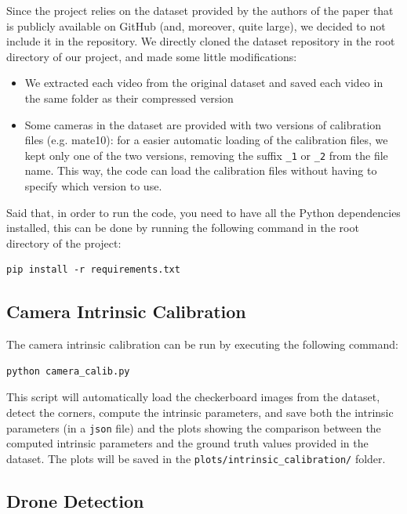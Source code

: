 \documentclass[11pt]{article}
\begin{document}
Since the project relies on the dataset provided by the authors of the paper that is publicly available on GitHub (and, moreover, quite large), we decided to not include it in the repository. We directly cloned the dataset repository in the root directory of our project, and made some little modifications:

\begin{itemize}
    \item We extracted each video from the original dataset and saved each video in the same folder as their compressed version
    \item Some cameras in the dataset are provided with two versions of calibration files (e.g. mate10): for a easier automatic loading of the calibration files, we kept only one of the two versions, removing the suffix \texttt{\_1} or \texttt{\_2} from the file name. This way, the code can load the calibration files without having to specify which version to use.
\end{itemize}

Said that, in order to run the code, you need to have all the Python dependencies installed, this can be done by running the following command in the root directory of the project:

\begin{verbatim}
pip install -r requirements.txt
\end{verbatim}

\subsection{Camera Intrinsic Calibration}

The camera intrinsic calibration can be run by executing the following command:

\begin{verbatim}
python camera_calib.py
\end{verbatim}

This script will automatically load the checkerboard images from the dataset, detect the corners, compute the intrinsic parameters, and save both the intrinsic parameters (in a \texttt{json} file) and the plots showing the comparison between the computed intrinsic parameters and the ground truth values provided in the dataset. The plots will be saved in the \texttt{plots/intrinsic\_calibration/} folder.

\subsection{Drone Detection}
\end{document}
